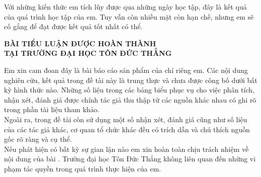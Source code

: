 	Với những kiến thức em tích lũy được qua những ngày học tập, đây là kết quả của quá trình học tập của em. Tuy vẫn còn nhiều mặt còn hạn chế, nhưng em sẽ cố gắng để đạt được kết quả tốt nhất có thể.\\
	\newpage
\begin{center}
	\Large{\textbf{BÀI TIỂU LUẬN ĐƯỢC HOÀN THÀNH}} \\
	\Large{\textbf{TẠI TRƯỜNG ĐẠI HỌC TÔN ĐỨC THẮNG}} \\
\end{center}	
Em xin cam đoan đây là bài báo cáo sản phẩm \bai \mbox{} của chỉ riêng em. Các nội dung nghiên cứu, kết quả trong đề tài này là trung thực và chưa được công bố dưới bất kỳ hình thức nào. Những số liệu trong các bảng biểu phục vụ cho việc phân tích, nhận xét, đánh giá được chính tác giả thu thập từ các nguồn khác nhau có ghi rõ trong phần tài liệu tham khảo.\\

Ngoài ra, trong đề tài còn sử dụng một số nhận xét, đánh giá cũng như số liệu của các tác giả khác, cơ quan tổ chức khác đều có trích dẫn và chú thích nguồn gốc rõ ràng và cụ thể.\\

Nếu phát hiện có bất kỳ sự gian lận nào em xin hoàn toàn chịu trách nhiệm về nội dung của bài \bai. Trường đại học Tôn Đức Thắng không liên quan đến những vi phạm tác quyền trong quá trình thực hiện của em.\\

